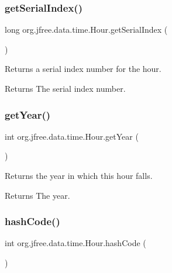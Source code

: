 \subsubsection{\texorpdfstring{get\+Serial\+Index()}{getSerialIndex()}}
{\footnotesize\ttfamily long org.\+jfree.\+data.\+time.\+Hour.\+get\+Serial\+Index (\begin{DoxyParamCaption}{ }\end{DoxyParamCaption})}

Returns a serial index number for the hour.

\begin{DoxyReturn}{Returns}
The serial index number. 
\end{DoxyReturn}
\mbox{\label{classorg_1_1jfree_1_1data_1_1time_1_1_hour_a567bbb7a156676712f4f88556d01c551}} 
\subsubsection{\texorpdfstring{get\+Year()}{getYear()}}
{\footnotesize\ttfamily int org.\+jfree.\+data.\+time.\+Hour.\+get\+Year (\begin{DoxyParamCaption}{ }\end{DoxyParamCaption})}

Returns the year in which this hour falls.

\begin{DoxyReturn}{Returns}
The year. 
\end{DoxyReturn}
\mbox{\label{classorg_1_1jfree_1_1data_1_1time_1_1_hour_a633e1439e511138189036c674102ea72}} 
\subsubsection{\texorpdfstring{hash\+Code()}{hashCode()}}
{\footnotesize\ttfamily int org.\+jfree.\+data.\+time.\+Hour.\+hash\+Code (\begin{DoxyParamCaption}{ }\end{DoxyParamCaption})}

